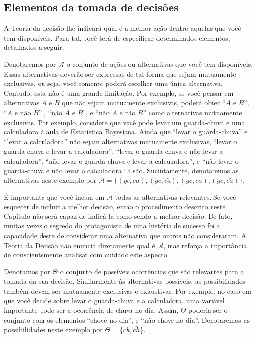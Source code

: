 \subsection{Elementos da tomada de decisões}
\label{section:decisions_elements}

A Teoria da decisão lhe indicará qual é a melhor ação
dentre aquelas que você tem disponíveis.
Para tal, você terá de especificar determinados elementos,
detalhados a seguir.

Denotaremos por $\mathcal{A}$ o conjunto de ações ou alternativas
que você tem disponíveis.
Essas alternativas deverão ser expressas de tal forma que sejam mutuamente exclusivas,
ou seja, você somente poderá escolher uma única alternativa.
Contudo, esta não é uma grande limitação.
Por exemplo, se você pensar em alternativas $A$ e $B$ que não sejam mutuamente exclusivas,
poderá obter ``$A \text{ e } B$'',
``$A \text{ e não } B$'' ,
``$\text{não } A \text{ e } B$'', e
``$\text{não } A \text{ e não } B$''
como alternativas mutuamente exclusivas. Por exemplo, 
considere que você pode levar um guarda-chuva e 
uma calculadora à aula de Estatística Bayesiana.
Ainda que ``levar o guarda-chuva'' e ``levar a calculadora''
não sejam alternativas mutuamente exclusivas,
``levar o guarda-chuva e levar a calculadora'',
``levar o guarda-chuva e não levar a calculadora'',
``não levar o guarda-chuva e levar a calculadora'', e
``não levar o guarda-chuva e não levar a calculadora'' o são.
Sucintamente, denotaremos as alternativas neste exemplo por
$\mathcal{A} = \{(gc,ca), (gc,\bar{ca}), (\bar{gc},ca), (\bar{gc},\bar{ca})\}$.

É importante que você inclua em $\mathcal{A}$
todas as alternativas relevantes.
Se você esquecer de incluir a melhor decisão,
então o procedimento descrito neste Capítulo
não será capaz de indicá-la como sendo a melhor decisão.
De fato, muitas vezes o segredo do protagonista de uma história de sucesso
foi a capacidade deste de considerar uma alternativa que outros não consideraram.
A Teoria da Decisão não
enuncia diretamente qual é $\mathcal{A}$,
mas reforça a importância de conscientemente analisar com cuidado este aspecto.

Denotamos por $\Theta$ o conjunto de possíveis ocorrências
que são relevantes para a tomada da sua decisão.
Similarmente às alternativas possíveis,
as possibilidades também devem ser
mutuamente exclusivas e exaustivas. 
Por exemplo, no caso em que você decide sobre levar o
guarda-chuva e a calculadora,
uma variável importante pode ser a
ocorrência de chuva no dia.
Assim,  $\Theta$ poderia ser
o conjunto com os elementos ``chove no dia'', e 
``não chove no dia''. Denotaremos as
possibilidades neste exemplo por
$\Theta = \{ch, \bar{ch}\}$.

